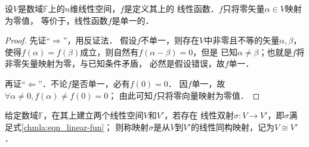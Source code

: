 \begin{proposition}\label{chmla:thm_OneOne}
    设$V$是数域$\mathbb{F}$上的$n$维线性空间，$f$是定义其上的
    线性函数．$f$只将零矢量$\alpha \in V$映射为零值，
    等价于，线性函数$f$是单一的．
\end{proposition}
\begin{proof}
    先证“$\Rightarrow$”，用反证法．
    假设$f$不单一，则存在$V$中非零且不等的矢量$\alpha,\beta$，
    使得$f(\alpha)=f(\beta)$成立，则自然有$f(\alpha-\beta)=0$，但是
    已知$\alpha \neq \beta$；也就是$f$将非零矢量映射为零，与已知条件矛盾，
    必然是假设错误，故$f$单一．

    再证“$\Leftarrow$”．不论$f$是否单一，必有$f(0)=0$．
    因$f$单一，故$\forall \alpha \neq 0, f(\alpha)\neq f(0)=0$；
    由此可知$f$只将零向量映射为零值．
\end{proof}





\begin{definition}\label{chmla:def_isomorphism}
    给定数域$\mathbb{F}$，在其上建立两个线性空间$V$和$V'$，若存在
    线性双射$\sigma:V\to V'$，即$\sigma$满足式\eqref{chmla:eqn_linear-fun}；
    则称映射$\sigma$是从$V$到$V'$的{\heiti 线性同构映射}，记为$V \cong V'$．
\end{definition}

